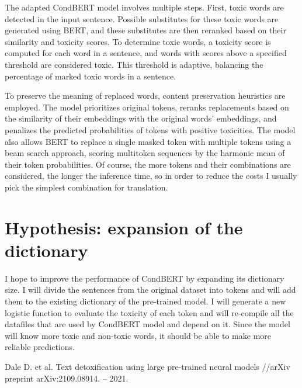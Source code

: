 \documentclass[]{article}
\begin{document}
	The adapted CondBERT model involves multiple steps. First, toxic words are detected in the input sentence. Possible substitutes for these toxic words are generated using BERT, and these substitutes are then reranked based on their similarity and toxicity scores. To determine toxic words, a toxicity score is computed for each word in a sentence, and words with scores above a specified threshold are considered toxic. This threshold is adaptive, balancing the percentage of marked toxic words in a sentence.
	
	To preserve the meaning of replaced words, content preservation heuristics are employed. The model prioritizes original tokens, reranks replacements based on the similarity of their embeddings with the original words' embeddings, and penalizes the predicted probabilities of tokens with positive toxicities. The model also allows BERT to replace a single masked token with multiple tokens using a beam search approach, scoring multitoken sequences by the harmonic mean of their token probabilities. Of course, the more tokens and their combinations are considered, the longer the inference time, so in order to reduce the costs I usually pick the simplest combination for translation.
	\\
	\section{Hypothesis: expansion of the dictionary}
	
	I hope to improve the performance of CondBERT by expanding its dictionary size. I will divide the sentences from the original dataset into tokens and will add them to the existing dictionary of the pre-trained model. I will generate a new logistic function to evaluate the toxicity of each token and will re-compile all the datafiles that are used by CondBERT model and depend on it. Since the model will know more toxic and non-toxic words, it should be able to make more reliable predictions.
	
	\begin{thebibliography}{99}
		 Dale D. et al. Text detoxification using large pre-trained neural models //arXiv preprint arXiv:2109.08914. – 2021.
	\end{thebibliography}
	
\end{document}
